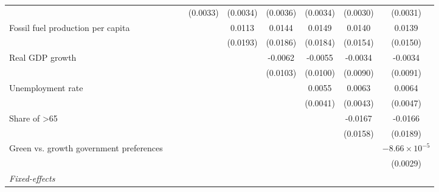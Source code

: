 \begin{table}[htbp]
\begin{tabular}{lcccccccc}
                                                &                 &                 & (0.0033)       & (0.0034)       & (0.0036)        & (0.0034)        & (0.0030)        & (0.0031)\\   
      Fossil fuel production per capita         &                 &                 &                & 0.0113         & 0.0144          & 0.0149          & 0.0140          & 0.0139\\   
                                                &                 &                 &                & (0.0193)       & (0.0186)        & (0.0184)        & (0.0154)        & (0.0150)\\   
      Real GDP growth                           &                 &                 &                &                & -0.0062         & -0.0055         & -0.0034         & -0.0034\\   
                                                &                 &                 &                &                & (0.0103)        & (0.0100)        & (0.0090)        & (0.0091)\\   
      Unemployment rate                         &                 &                 &                &                &                 & 0.0055          & 0.0063          & 0.0064\\   
                                                &                 &                 &                &                &                 & (0.0041)        & (0.0043)        & (0.0047)\\   
      Share of >65                              &                 &                 &                &                &                 &                 & -0.0167         & -0.0166\\   
                                                &                 &                 &                &                &                 &                 & (0.0158)        & (0.0189)\\   
      Green vs. growth government preferences   &                 &                 &                &                &                 &                 &                 & $-8.66\times 10^{-5}$\\    
                                                &                 &                 &                &                &                 &                 &                 & (0.0029)\\   
      \midrule
      \emph{Fixed-effects}\\

\end{tabular}
\end{table}
